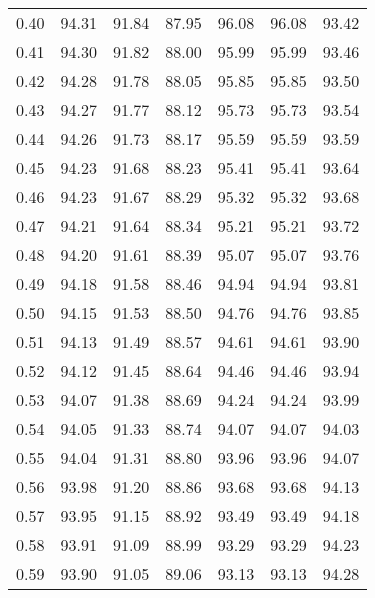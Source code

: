 \begin{tabular}{|c|c|c|c|c|c|c|}
      0.40 &     94.31 &     91.84 &      87.95 &   96.08 &      96.08 &         93.42 \\
      0.41 &     94.30 &     91.82 &      88.00 &   95.99 &      95.99 &         93.46 \\
      0.42 &     94.28 &     91.78 &      88.05 &   95.85 &      95.85 &         93.50 \\
      0.43 &     94.27 &     91.77 &      88.12 &   95.73 &      95.73 &         93.54 \\
      0.44 &     94.26 &     91.73 &      88.17 &   95.59 &      95.59 &         93.59 \\
      0.45 &     94.23 &     91.68 &      88.23 &   95.41 &      95.41 &         93.64 \\
      0.46 &     94.23 &     91.67 &      88.29 &   95.32 &      95.32 &         93.68 \\
      0.47 &     94.21 &     91.64 &      88.34 &   95.21 &      95.21 &         93.72 \\
      0.48 &     94.20 &     91.61 &      88.39 &   95.07 &      95.07 &         93.76 \\
      0.49 &     94.18 &     91.58 &      88.46 &   94.94 &      94.94 &         93.81 \\
      0.50 &     94.15 &     91.53 &      88.50 &   94.76 &      94.76 &         93.85 \\
      0.51 &     94.13 &     91.49 &      88.57 &   94.61 &      94.61 &         93.90 \\
      0.52 &     94.12 &     91.45 &      88.64 &   94.46 &      94.46 &         93.94 \\
      0.53 &     94.07 &     91.38 &      88.69 &   94.24 &      94.24 &         93.99 \\
      0.54 &     94.05 &     91.33 &      88.74 &   94.07 &      94.07 &         94.03 \\
      0.55 &     94.04 &     91.31 &      88.80 &   93.96 &      93.96 &         94.07 \\
      0.56 &     93.98 &     91.20 &      88.86 &   93.68 &      93.68 &         94.13 \\
      0.57 &     93.95 &     91.15 &      88.92 &   93.49 &      93.49 &         94.18 \\
      0.58 &     93.91 &     91.09 &      88.99 &   93.29 &      93.29 &         94.23 \\
      0.59 &     93.90 &     91.05 &      89.06 &   93.13 &      93.13 &         94.28 \\

\end{tabular}
